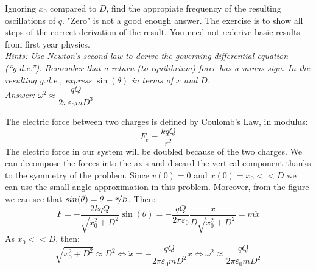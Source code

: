 \documentclass{report}
\begin{document}
{\vspace{0.5cm}Ignoring $x_0$ compared to $D$, find the appropiate frequency of the resulting oscillations of $q$. "Zero" is not a good enough answer. The exercise is to show all steps of the correct derivation of the result. You need not rederive basic results from first year physics.\\

\vspace{0.3cm}\textit{\underline{Hints}: Use Newton's second law to derive the governing differential equation (“g.d.e.”). Remember that a return (to equilibrium) force has a minus sign. In the resulting g.d.e., express $\sin(\theta)$ in terms of $x$ and $D$.\\
\underline{Answer}: $\omega^2\approx \dfrac{qQ}{2\pi\varepsilon_0 m D^3}$}}

  \noindent The electric force between two charges is defined by Coulomb's Law, in modulus:
  \[F_e = \dfrac{kqQ}{r^2}\]
  \noindent The electric force in our system will be doubled because of the two charges. We can decompose the forces into the axis and discard the vertical component thanks to the symmetry of the problem. Since $v(0)=0$ and $x(0)=x_0<<D$ we can use the small angle approximation in this problem. Moreover, from the figure we can see that $sin(\theta)=\theta=\nicefrac{x}{D}$. Then:
  \[F = -\dfrac{2kqQ}{\sqrt{x_0^2+D^2}}\sin(\theta) = -\dfrac{qQ}{2\pi\varepsilon_0}\dfrac{x}{D\sqrt{x_0^2+D^2}}=m\ddot{x} \]
  \noindent As $x_0 << D$, then:
  \[\sqrt{x_0^2+D^2}\approx D^2 \Longleftrightarrow \ddot{x}=-\dfrac{qQ}{2\pi\varepsilon_0 mD^2} x \Longleftrightarrow \boxed{\omega^2\approx\dfrac{qQ}{2\pi\varepsilon_0 mD^2}}\]
\end{document}
